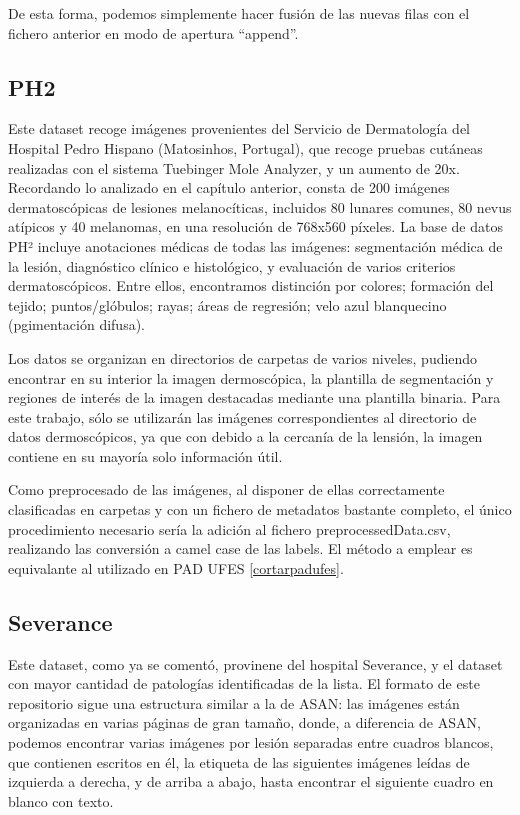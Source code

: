 De esta forma, podemos simplemente hacer fusión de las nuevas filas con el fichero anterior en modo de apertura ``append''.

\subsection{PH2}

Este dataset recoge imágenes provenientes del Servicio de Dermatología del Hospital Pedro Hispano (Matosinhos, Portugal), que recoge pruebas cutáneas realizadas con el sistema Tuebinger Mole Analyzer, y un aumento de 20x. Recordando lo analizado en el capítulo anterior, consta de 200 imágenes dermatoscópicas de lesiones melanocíticas, incluidos 80 lunares comunes, 80 nevus atípicos y 40 melanomas, en una resolución de 768x560 píxeles. La base de datos PH² incluye anotaciones médicas de todas las imágenes: segmentación médica de la lesión, diagnóstico clínico e histológico, y evaluación de varios criterios dermatoscópicos. Entre ellos, encontramos distinción por colores; formación del tejido; puntos/glóbulos; rayas; áreas de regresión; velo azul blanquecino (pgimentación difusa).

Los datos se organizan en directorios de carpetas de varios niveles,  pudiendo encontrar en su interior la imagen dermoscópica, la plantilla de segmentación y regiones de interés de la imagen destacadas mediante una plantilla binaria. Para este trabajo, sólo se utilizarán las imágenes correspondientes al directorio de datos dermoscópicos, ya que con debido a la cercanía de la lensión, la imagen contiene en su mayoría solo información útil.

Como preprocesado de las imágenes, al disponer de ellas correctamente clasificadas en carpetas y con un fichero de metadatos bastante completo, el único procedimiento necesario sería la adición al fichero preprocessedData.csv, realizando las conversión a camel case de las labels. El método a emplear es equivalante al utilizado en PAD UFES \ref{cortarpadufes}.

 \subsection{Severance}
 
 Este dataset, como ya se comentó, provinene del hospital Severance, y el dataset con mayor cantidad de patologías identificadas de la lista. El formato de este repositorio sigue una estructura similar a la de ASAN: las imágenes están organizadas en varias páginas de gran tamaño, donde, a diferencia de ASAN, podemos encontrar varias imágenes por lesión separadas entre cuadros blancos, que contienen escritos en él, la etiqueta de las siguientes imágenes leídas de izquierda a derecha, y de arriba a abajo, hasta encontrar el siguiente cuadro en blanco con texto.
 
